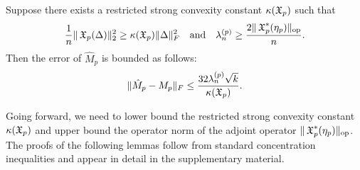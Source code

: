 



\begin{lemma}
\label{lem:lowRank}
Suppose there exists a restricted strong convexity constant $\kappa(\operatorname{\mathfrak{X}}_p)$ such that
$$\frac{1}{n} \| \operatorname{\mathfrak{X}}_p( \Delta )\|_2^2 \ge \kappa(\operatorname{\mathfrak{X}}_p) \|\Delta\|^2_F \quad \text{and} \quad
\lambda^{(p)}_n \ge \frac{2 \|\operatorname{\mathfrak{X}}_p^*(\eta_p)\|_{\text{\rm op}}}{n}.$$
Then the error of $\hat M_p$ is bounded as follows:
$$\| \hat M_p - M_p \|_F \le \frac{32 \lambda^{(p)}_n \sqrt{k}}{\kappa(\operatorname{\mathfrak{X}}_p)}.$$
\end{lemma}

Going forward, we need to lower bound the restricted strong convexity
constant $\kappa(\operatorname{\mathfrak{X}}_p)$ and upper bound the operator norm of the adjoint operator
$\|\operatorname{\mathfrak{X}}_p^*(\eta_p)\|_{\text{\rm op}}$. The proofs of the following lemmas follow
from standard concentration inequalities and appear in detail in the
supplementary material.

